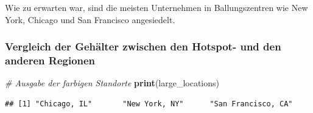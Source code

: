 \documentclass[
]{article}
\newenvironment{Shaded}{\begin{snugshade}}{\end{snugshade}}
\newcommand{\CommentTok}[1]{\textcolor[rgb]{0.56,0.35,0.01}{\textit{#1}}}
\newcommand{\FunctionTok}[1]{\textcolor[rgb]{0.13,0.29,0.53}{\textbf{#1}}}
\newcommand{\NormalTok}[1]{#1}
\begin{document}
Wie zu erwarten war, sind die meisten Unternehmen in Ballungszentren wie
New York, Chicago und San Francisco angesiedelt.

\subsubsection{Vergleich der Gehälter zwischen den Hotspot- und den
anderen
Regionen}\label{vergleich-der-gehuxe4lter-zwischen-den-hotspot--und-den-anderen-regionen}

\begin{Shaded}
\begin{Highlighting}[]
\CommentTok{\# Ausgabe der farbigen Standorte}
\FunctionTok{print}\NormalTok{(large\_locations)}
\end{Highlighting}
\end{Shaded}

\begin{verbatim}
## [1] "Chicago, IL"       "New York, NY"      "San Francisco, CA"
\end{verbatim}
\end{document}
